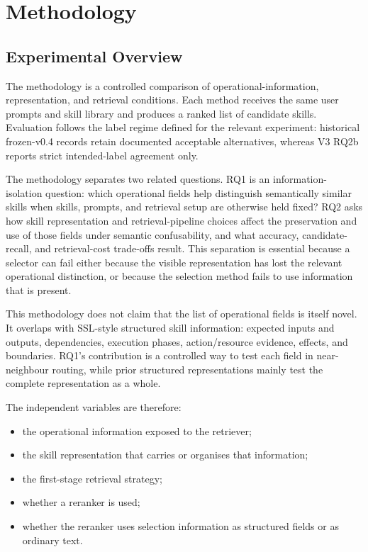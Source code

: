 \chapter{Methodology}

\section{Experimental Overview}

The methodology is a controlled comparison of operational-information, representation, and retrieval conditions. Each method receives the same user prompts and skill library and produces a ranked list of candidate skills. Evaluation follows the label regime defined for the relevant experiment: historical frozen-v0.4 records retain documented acceptable alternatives, whereas V3 RQ2b reports strict intended-label agreement only.

The methodology separates two related questions. RQ1 is an information-isolation question: which operational fields help distinguish semantically similar skills when skills, prompts, and retrieval setup are otherwise held fixed? RQ2 asks how skill representation and retrieval-pipeline choices affect the preservation and use of those fields under semantic confusability, and what accuracy, candidate-recall, and retrieval-cost trade-offs result. This separation is essential because a selector can fail either because the visible representation has lost the relevant operational distinction, or because the selection method fails to use information that is present.

This methodology does not claim that the list of operational fields is itself novel. It overlaps with SSL-style structured skill information: expected inputs and outputs, dependencies, execution phases, action/resource evidence, effects, and boundaries. RQ1's contribution is a controlled way to test each field in near-neighbour routing, while prior structured representations mainly test the complete representation as a whole.

The independent variables are therefore:

\begin{itemize}
  \item the operational information exposed to the retriever;
  \item the skill representation that carries or organises that information;
  \item the first-stage retrieval strategy;
  \item whether a reranker is used;
  \item whether the reranker uses selection information as structured fields or as ordinary text.
\end{itemize}


